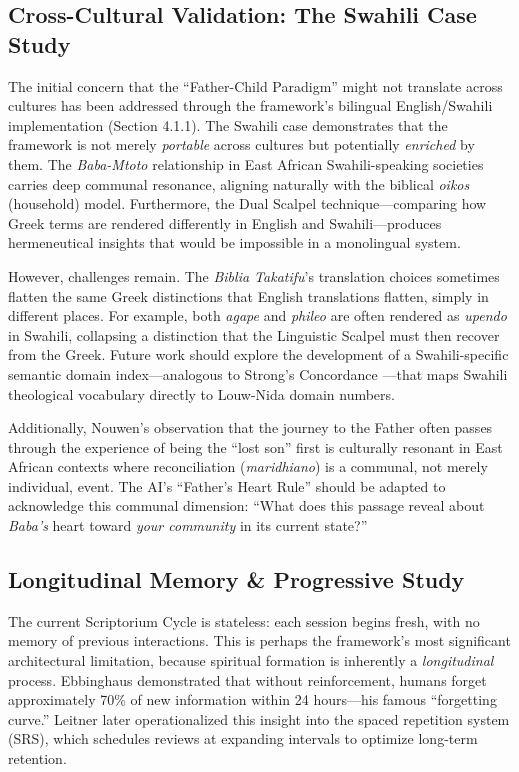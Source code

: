 \subsection{Cross-Cultural Validation: The Swahili Case Study}
The initial concern that the ``Father-Child Paradigm'' might not translate across cultures has been addressed through the framework's bilingual English/Swahili implementation (Section 4.1.1). The Swahili case demonstrates that the framework is not merely \textit{portable} across cultures but potentially \textit{enriched} by them. The \textit{Baba-Mtoto} relationship in East African Swahili-speaking societies carries deep communal resonance, aligning naturally with the biblical \textit{oikos} (household) model. Furthermore, the Dual Scalpel technique---comparing how Greek terms are rendered differently in English and Swahili---produces hermeneutical insights that would be impossible in a monolingual system.

However, challenges remain. The \textit{Biblia Takatifu}'s translation choices sometimes flatten the same Greek distinctions that English translations flatten, simply in different places. For example, both \textit{agape} and \textit{phileo} are often rendered as \textit{upendo} in Swahili, collapsing a distinction that the Linguistic Scalpel must then recover from the Greek. Future work should explore the development of a Swahili-specific semantic domain index---analogous to Strong's Concordance \cite{strong1890}---that maps Swahili theological vocabulary directly to Louw-Nida \cite{louwnida1988} domain numbers.

Additionally, Nouwen's \cite{nouwen1992} observation that the journey to the Father often passes through the experience of being the ``lost son'' first is culturally resonant in East African contexts where reconciliation (\textit{maridhiano}) is a communal, not merely individual, event. The AI's ``Father's Heart Rule'' should be adapted to acknowledge this communal dimension: ``What does this passage reveal about \textit{Baba's} heart toward \textit{your community} in its current state?''


\subsection{Longitudinal Memory \& Progressive Study}
The current Scriptorium Cycle is stateless: each session begins fresh, with no memory of previous interactions. This is perhaps the framework's most significant architectural limitation, because spiritual formation is inherently a \textit{longitudinal} process. Ebbinghaus \cite{ebbinghaus1885} demonstrated that without reinforcement, humans forget approximately 70\% of new information within 24 hours---his famous ``forgetting curve.'' Leitner \cite{leitner1972} later operationalized this insight into the spaced repetition system (SRS), which schedules reviews at expanding intervals to optimize long-term retention.

